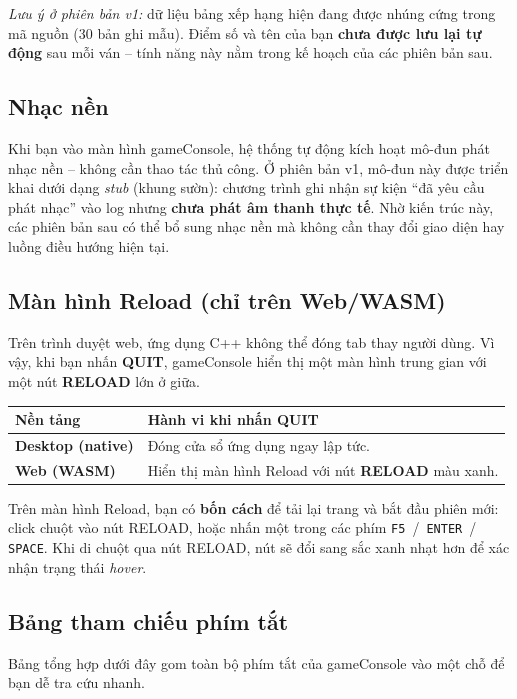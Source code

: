 \documentclass[12pt,a4paper]{article}
\begin{document}
\vspace{4pt}
\noindent\textit{Lưu ý ở phiên bản v1:} dữ liệu bảng xếp hạng hiện đang được nhúng cứng trong mã nguồn (30 bản ghi mẫu). Điểm số và tên của bạn \textbf{chưa được lưu lại tự động} sau mỗi ván -- tính năng này nằm trong kế hoạch của các phiên bản sau.

\subsection{Nhạc nền}
Khi bạn vào màn hình gameConsole, hệ thống tự động kích hoạt mô-đun phát nhạc nền -- không cần thao tác thủ công. Ở phiên bản v1, mô-đun này được triển khai dưới dạng \textit{stub} (khung sườn): chương trình ghi nhận sự kiện ``đã yêu cầu phát nhạc'' vào log nhưng \textbf{chưa phát âm thanh thực tế}. Nhờ kiến trúc này, các phiên bản sau có thể bổ sung nhạc nền mà không cần thay đổi giao diện hay luồng điều hướng hiện tại.

\subsection{Màn hình Reload (chỉ trên Web/WASM)}
Trên trình duyệt web, ứng dụng C++ không thể đóng tab thay người dùng. Vì vậy, khi bạn nhấn \textbf{QUIT}, gameConsole hiển thị một màn hình trung gian với một nút \textbf{RELOAD} lớn ở giữa.

\vspace{4pt}
\begin{tabularx}{\linewidth}{|l|X|}
    \hline
    \textbf{Nền tảng} & \textbf{Hành vi khi nhấn QUIT} \\
    \hline
    \textbf{Desktop (native)} & Đóng cửa sổ ứng dụng ngay lập tức. \\
    \hline
    \textbf{Web (WASM)}       & Hiển thị màn hình Reload với nút \textbf{RELOAD} màu xanh. \\
    \hline
\end{tabularx}

\vspace{4pt}
\noindent Trên màn hình Reload, bạn có \textbf{bốn cách} để tải lại trang và bắt đầu phiên mới: click chuột vào nút RELOAD, hoặc nhấn một trong các phím \texttt{F5} \,/\, \texttt{ENTER} \,/\, \texttt{SPACE}. Khi di chuột qua nút RELOAD, nút sẽ đổi sang sắc xanh nhạt hơn để xác nhận trạng thái \textit{hover}.

\subsection{Bảng tham chiếu phím tắt}
Bảng tổng hợp dưới đây gom toàn bộ phím tắt của gameConsole vào một chỗ để bạn dễ tra cứu nhanh.
\end{document}
